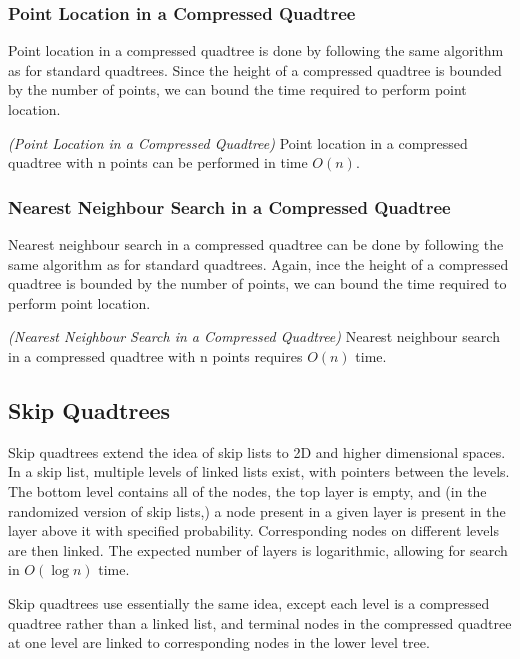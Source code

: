 \documentclass[mcs]{scsthesis}
\begin{document}
\subsubsection{Point Location in a Compressed Quadtree}

Point location in a compressed quadtree is done by following the same algorithm
as for standard quadtrees. Since the height of a compressed quadtree is
bounded by the number of points, we can bound the time required to perform
point location.

\begin{thm} \emph{(Point Location in a Compressed Quadtree)} 
Point location in a compressed quadtree with n points can be performed in
time \(O(n)\). 
\end{thm}

\subsubsection{Nearest Neighbour Search in a Compressed Quadtree}

Nearest neighbour search in a compressed quadtree can be done by following the
same algorithm as for standard quadtrees. Again, ince the height of a compressed
quadtree is bounded by the number of points, we can bound the time required to
perform point location.

\begin{thm} \emph{(Nearest Neighbour Search in a Compressed Quadtree)} 
Nearest neighbour search in a compressed quadtree with n points requires
\(O(n)\) time.
\end{thm}

\subsection{Skip Quadtrees}

Skip quadtrees extend the idea of skip lists \cite{skiplist} to 2D and higher
dimensional spaces. In a skip list, multiple levels of linked lists exist, with
pointers between the levels.  The bottom level contains all of the nodes, the
top layer is empty, and (in the randomized version of skip lists,) a node
present in a given layer is present in the layer above it with specified
probability.  Corresponding nodes on different levels are then linked. The
expected number of layers is logarithmic, allowing for search in \(O(\log n)\)
time.

Skip quadtrees use essentially the same idea, except each level is a
compressed quadtree rather than a linked list, and terminal nodes in the
compressed quadtree at one level are linked to corresponding nodes in the
lower level tree.
\end{document}
